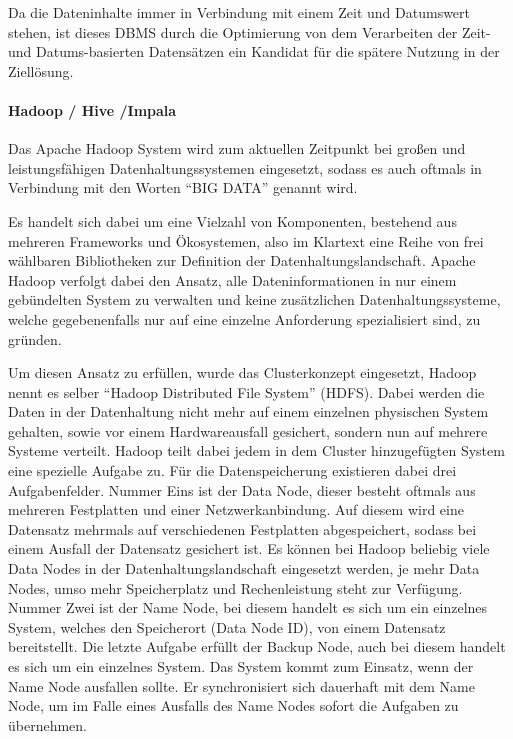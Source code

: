 Da die Dateninhalte immer in Verbindung mit einem Zeit und Datumswert stehen,
ist dieses \gls{DBMS} durch die Optimierung von dem Verarbeiten der Zeit- und
Datums-basierten Datensätzen ein Kandidat für die spätere Nutzung in der
Ziellösung.
\nl%

\paragraph{Hadoop / Hive /Impala}
\label{paragraph:hadoop_hive_impala}
Das Apache Hadoop System wird zum aktuellen Zeitpunkt bei
großen und leistungsfähigen Datenhaltungssystemen eingesetzt, sodass es
auch oftmals in Verbindung mit den Worten ``BIG DATA'' genannt wird.

Es handelt sich dabei um eine Vielzahl von Komponenten, bestehend aus mehreren
Frameworks und Ökosystemen, also im Klartext eine Reihe von frei wählbaren
Bibliotheken zur Definition der Datenhaltungslandschaft. Apache Hadoop verfolgt
dabei den Ansatz, alle Dateninformationen in nur einem gebündelten System zu
verwalten und keine zusätzlichen Datenhaltungssysteme, welche gegebenenfalls
nur auf eine einzelne Anforderung spezialisiert sind, zu gründen.

Um diesen Ansatz zu erfüllen, wurde das Clusterkonzept eingesetzt, Hadoop nennt
es selber ``Hadoop Distributed File System'' (HDFS).  Dabei werden die Daten in
der Datenhaltung nicht mehr auf einem einzelnen physischen System gehalten,
sowie vor einem Hardwareausfall gesichert, sondern nun auf mehrere Systeme
verteilt. Hadoop teilt dabei jedem in dem Cluster hinzugefügten System eine
spezielle Aufgabe zu. Für die Datenspeicherung existieren dabei drei
Aufgabenfelder. Nummer Eins ist der Data Node, dieser besteht oftmals aus
mehreren Festplatten und einer Netzwerkanbindung. Auf diesem wird eine
Datensatz mehrmals auf verschiedenen Festplatten abgespeichert, sodass bei
einem Ausfall der Datensatz gesichert ist. Es können bei Hadoop beliebig viele
Data Nodes in der Datenhaltungslandschaft eingesetzt werden, je mehr Data
Nodes, umso mehr Speicherplatz und Rechenleistung steht zur Verfügung. Nummer
Zwei ist der Name Node, bei diesem handelt es sich um ein einzelnes System,
welches den Speicherort (Data Node ID), von einem Datensatz bereitstellt. Die
letzte Aufgabe erfüllt der Backup Node, auch bei diesem handelt es sich um ein
einzelnes System. Das System kommt zum Einsatz, wenn der Name Node ausfallen
sollte. Er synchronisiert sich dauerhaft mit dem Name Node, um im Falle eines
Ausfalls des Name Nodes sofort die Aufgaben zu übernehmen.


